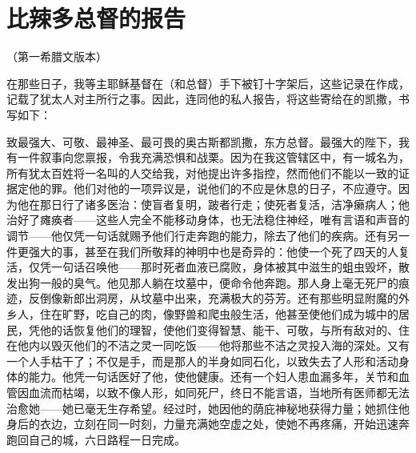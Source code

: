 
\chapter{比辣多总督的报告}


\par

（第一希腊文版本）\par

在那些日子，我等主耶稣基督在（和总督）手下被钉十字架后，这些记录在作成，记载了犹太人对主所行之事。因此，连同他的私人报告，将这些寄给在的凯撒，书写如下：\par

致最强大、可敬、最神圣、最可畏的奥古斯都凯撒，东方总督。最强大的陛下，我有一件叙事向您禀报，令我充满恐惧和战栗。因为在我这管辖区中，有一城名为，所有犹太百姓将一名叫的人交给我，对他提出许多指控，然而他们不能以一致的证据定他的罪。他们对他的一项异议是，说他们的不应是休息的日子，不应遵守。因为他在那日行了诸多医治：使盲者复明，跛者行走；使死者复活，洁净癞病人；他治好了瘫痪者——这些人完全不能移动身体，也无法稳住神经，唯有言语和声音的调节——他仅凭一句话就赐予他们行走奔跑的能力，除去了他们的疾病。还有另一件更强大的事，甚至在我们所敬拜的神明中也是奇异的：他使一个死了四天的人复活，仅凭一句话召唤他——那时死者血液已腐败，身体被其中滋生的蛆虫毁坏，散发出狗一般的臭气。他见那人躺在坟墓中，便命令他奔跑。那人身上毫无死尸的痕迹，反倒像新郎出洞房，从坟墓中出来，充满极大的芬芳。还有那些明显附魔的外乡人，住在旷野，吃自己的肉，像野兽和爬虫般生活，他甚至使他们成为城中的居民，凭他的话恢复他们的理智，使他们变得智慧、能干、可敬，与所有敌对的、住在他内以毁灭他们的不洁之灵一同吃饭——他将那些不洁之灵投入海的深处。又有一个人手枯干了；不仅是手，而是那人的半身如同石化，以致失去了人形和活动身体的能力。他凭一句话医好了他，使他健康。还有一个妇人患血漏多年，关节和血管因血流而枯竭，以致不像人形，如同死尸，终日不能言语，当地所有医师都无法治愈她——她已毫无生存希望。经过时，她因他的荫庇神秘地获得力量；她抓住他身后的衣边，立刻在同一时刻，力量充满她空虚之处，使她不再疼痛，开始迅速奔跑回自己的城，六日路程一日完成。\par

